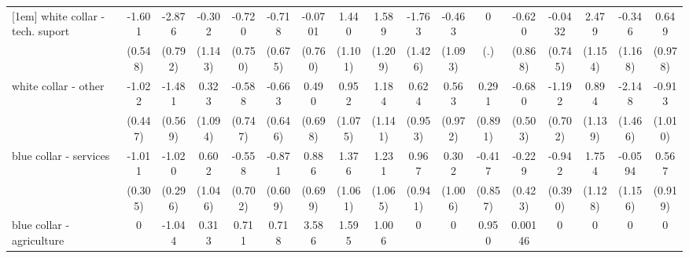 {\begin{tabular}{l*{16}{c}}
[1em]
white collar - tech. suport&      -1.601\sym{**} &      -2.876\sym{***}&      -0.302         &      -0.720         &      -0.718         &     -0.0701         &       1.440         &       1.589         &      -1.763         &      -0.463         &           0         &      -0.620         &     -0.0432         &       2.479\sym{*}  &      -0.346         &       0.649         \\
                    &     (0.548)         &     (0.792)         &     (1.143)         &     (0.750)         &     (0.675)         &     (0.760)         &     (1.101)         &     (1.209)         &     (1.426)         &     (1.093)         &         (.)         &     (0.868)         &     (0.745)         &     (1.154)         &     (1.168)         &     (0.978)         \\
[1em]
white collar - other&      -1.022\sym{*}  &      -1.481\sym{**} &       0.323         &      -0.588         &      -0.663         &       0.490         &       0.952         &       1.184         &       0.624         &       0.563         &       0.291         &      -0.680         &      -1.192         &       0.894         &      -2.148         &      -0.913         \\
                    &     (0.447)         &     (0.569)         &     (1.094)         &     (0.747)         &     (0.646)         &     (0.698)         &     (1.075)         &     (1.141)         &     (0.953)         &     (0.972)         &     (0.891)         &     (0.503)         &     (0.702)         &     (1.139)         &     (1.466)         &     (1.010)         \\
[1em]
blue collar - services&      -1.011\sym{***}&      -1.020\sym{***}&       0.602         &      -0.558         &      -0.871         &       0.886         &       1.376         &       1.231         &       0.967         &       0.302         &      -0.417         &      -0.229         &      -0.942\sym{*}  &       1.754         &     -0.0594         &       0.567         \\
                    &     (0.305)         &     (0.296)         &     (1.046)         &     (0.702)         &     (0.609)         &     (0.699)         &     (1.061)         &     (1.065)         &     (0.941)         &     (1.006)         &     (0.857)         &     (0.423)         &     (0.390)         &     (1.128)         &     (1.156)         &     (0.919)         \\
[1em]
blue collar - agriculture&           0         &      -1.044         &       0.313         &       0.711         &       0.718         &       3.586\sym{**} &       1.595         &       1.006         &           0         &           0         &       0.950         &     0.00146         &           0         &           0         &           0         &           0         \\

\end{tabular}}
